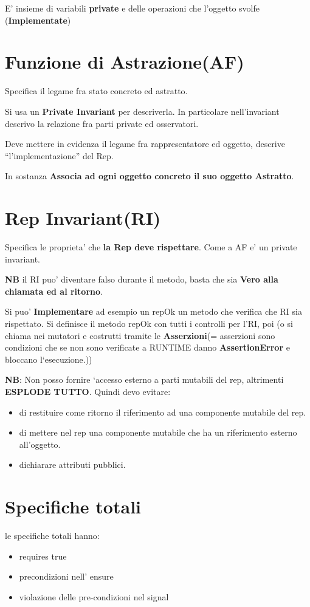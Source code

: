 \documentclass[\main/main.tex]{subfiles}
\begin{document}
E' insieme di variabili \textbf{private} e delle operazioni che l'oggetto svolfe (\textbf{Implementate})

\section{Funzione di Astrazione(AF)}
Specifica il legame fra stato concreto ed astratto.

Si usa un \textbf{Private Invariant} per descriverla. In particolare nell'invariant descrivo la relazione fra parti private ed osservatori.

Deve mettere in evidenza il legame fra rappresentatore ed oggetto, descrive ``l'implementazione'' del Rep.

In sostanza \textbf{Associa ad ogni oggetto concreto il suo oggetto Astratto}.

\section{Rep Invariant(RI)}
Specifica le proprieta' che \textbf{la Rep deve rispettare}.
Come a AF e' un private invariant.

\textbf{NB} il RI puo' diventare falso durante il metodo, basta che sia \textbf{Vero alla chiamata ed al ritorno}.

Si puo' \textbf{Implementare} ad esempio un repOk un metodo che verifica che RI sia rispettato.  Si definisce il metodo repOk con tutti i controlli per l'RI, poi (o si chiama nei mutatori e costrutti tramite le \textbf{Asserzioni}(= asserzioni sono condizioni che se non sono verificate a RUNTIME danno \textbf{AssertionError} e bloccano l`esecuzione.))

\textbf{NB}: Non posso fornire `accesso esterno a parti mutabili del rep, altrimenti \textbf{ESPLODE TUTTO}.
Quindi devo evitare:
\begin{itemize}
\item di restituire come ritorno il riferimento ad una componente mutabile del rep.
\item di mettere nel rep una componente mutabile che ha un riferimento esterno all'oggetto.
\item dichiarare attributi pubblici.
\end{itemize}

\section{Specifiche totali}
le specifiche totali hanno:
\begin{itemize}
\item requires true
\item precondizioni nell' ensure
\item violazione delle pre-condizioni nel signal
\end{itemize}
\end{document}
